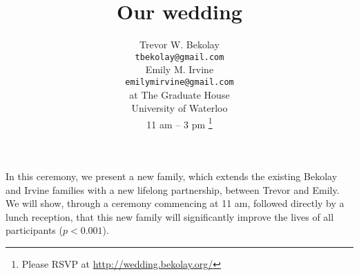 \documentclass{article}
\title{Our wedding}
\author{
  Trevor W. Bekolay \\
  \texttt{tbekolay@gmail.com} \\
  \And
  Emily M. Irvine \\
  \texttt{emilymirvine@gmail.com} \\
  \AND
  \textmd{at} The Graduate House \\
  University of Waterloo \\
  11 am -- 3 pm \thanks{Please RSVP at \url{http://wedding.bekolay.org/}}
}
\renewenvironment{abstract}
 {\normalsize
  \begin{center}
  \bfseries \abstractname\vspace{-.5em}\vspace{0pt}
  \end{center}
  \list{}{%
    \setlength{\leftmargin}{5mm}
    \setlength{\rightmargin}{\leftmargin}%
  }%
  \item\relax}
 {\endlist}
\begin{document}

\maketitle

\vspace{-2.5em}
\begin{abstract}
  In this ceremony, we present a new family,
  which extends the existing Bekolay and Irvine families
  with a new lifelong partnership, between Trevor and Emily.
  We will show, through a ceremony commencing at 11 am,
  followed directly by a lunch reception,
  that this new family will significantly improve the lives
  of all participants ($p < 0.001$).
\end{abstract}
\end{document}
